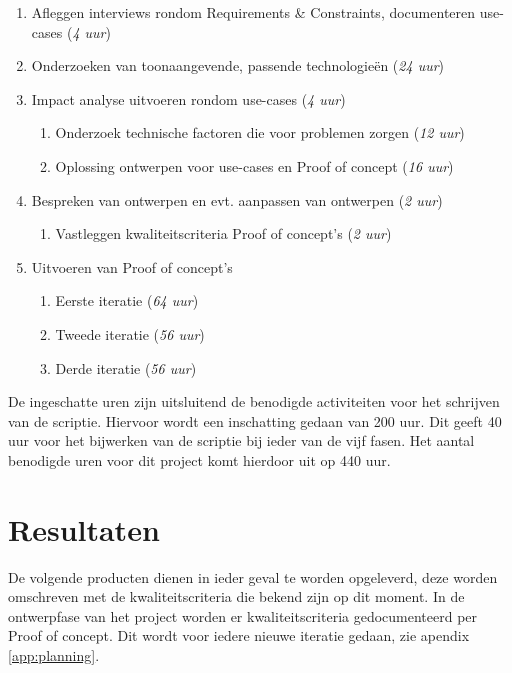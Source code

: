 \begin{enumerate}
    \item Afleggen interviews rondom Requirements \& Constraints, documenteren use-cases  (\textit{4 uur})
    \item Onderzoeken van toonaangevende, passende technologieën (\textit{24 uur})
    \item Impact analyse uitvoeren rondom use-cases (\textit{4 uur})
    \begin{enumerate}
        \item Onderzoek technische factoren die voor problemen zorgen (\textit{12 uur})
        \item Oplossing ontwerpen voor use-cases en Proof of concept (\textit{16 uur})
    \end{enumerate}
    \item Bespreken van ontwerpen en evt. aanpassen van ontwerpen (\textit{2 uur})
    \begin{enumerate}
        \item Vastleggen kwaliteitscriteria Proof of concept's (\textit{2 uur})
    \end{enumerate}
    \item Uitvoeren van Proof of concept's
    \begin{enumerate}
        \item Eerste iteratie (\textit{64 uur})
        \item Tweede iteratie (\textit{56 uur})
        \item Derde iteratie (\textit{56 uur})
    \end{enumerate}
\end{enumerate}


De ingeschatte uren zijn uitsluitend de benodigde activiteiten voor het schrijven van de scriptie. Hiervoor wordt een inschatting gedaan van 200 uur. Dit geeft 40 uur voor het bijwerken van de scriptie bij ieder van de vijf fasen. Het aantal benodigde uren voor dit project komt hierdoor uit op 440 uur.

\clearpage

\section{Resultaten}

De volgende producten dienen in ieder geval te worden opgeleverd, deze worden omschreven met de kwaliteitscriteria die bekend zijn op dit moment. In de ontwerpfase van het project worden er kwaliteitscriteria gedocumenteerd per Proof of concept. Dit wordt voor iedere nieuwe iteratie gedaan, zie apendix \ref{app:planning}.

